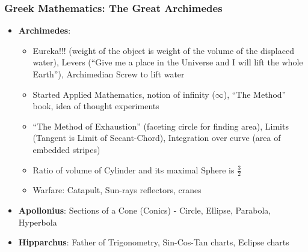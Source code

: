 \begin{frame}[fragile]
\frametitle{Greek Mathematics: The Great Archimedes}
\begin{itemize}
\item \textbf{Archimedes}: 
	\begin{itemize}
	\item Eureka!!! (weight of the object is weight of the volume of the displaced water), Levers (``Give me a place in the Universe and I will lift the whole Earth''), 	Archimedian Screw to lift water
	\item Started Applied Mathematics, notion of infinity ($\infty$), ``The Method'' book, idea of thought experiments
	\item ``The Method of Exhaustion'' (faceting circle for finding area), Limits (Tangent is Limit of Secant-Chord), Integration over curve (area of embedded stripes)
	\item Ratio of volume of Cylinder and its maximal Sphere is $\frac{3}{2}$
	\item Warfare: Catapult, Sun-rays reflectors, cranes
	\end{itemize}
\item \textbf{Apollonius}: Sections of a Cone (Conics) - Circle, Ellipse, Parabola, Hyperbola
\item \textbf{Hipparchus}: Father of Trigonometry, Sin-Cos-Tan charts, Eclipse charts 
\end{itemize}
\end{frame}

